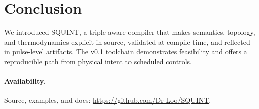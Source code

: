\documentclass[11pt]{article}
\newcommand{\SQUINT}{\textsc{SQUINT}}
\begin{document}
\section{Conclusion}
We introduced \SQUINT, a triple-aware compiler that makes semantics, topology, and thermodynamics explicit in source, validated at compile time, and reflected in pulse-level artifacts. The v0.1 toolchain demonstrates feasibility and offers a reproducible path from physical intent to scheduled controls.

\paragraph{Availability.} Source, examples, and docs: \url{https://github.com/Dr-Loo/SQUINT}.



\end{document}
